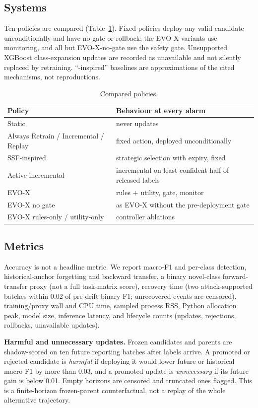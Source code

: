 \documentclass[conference]{IEEEtran}
\newcommand{\evox}{\textsc{EVO-X}}
\begin{document}
\subsection{Systems}
Ten policies are compared (Table~\ref{tab:systems}). Fixed policies deploy any valid candidate unconditionally and have no gate or rollback; the \evox{} variants use monitoring, and all but \evox-no-gate use the safety gate. Unsupported XGBoost class-expansion updates are recorded as unavailable and not silently replaced by retraining. ``-inspired'' baselines are approximations of the cited mechanisms, not reproductions.
\begin{table}[t]
\centering\caption{Compared policies.}\label{tab:systems}
\footnotesize
\begin{tabular}{ll}
\toprule
Policy & Behaviour at every alarm\\
\midrule
Static & never updates\\
Always Retrain / Incremental / Replay & fixed action, deployed unconditionally\\
SSF-inspired & strategic selection with expiry, fixed\\
Active-incremental & incremental on least-confident half of released labels\\
\evox{} & rules $+$ utility, gate, monitor\\
\evox{} no gate & as \evox{} without the pre-deployment gate\\
\evox{} rules-only / utility-only & controller ablations\\
\bottomrule
\end{tabular}
\end{table}

\subsection{Metrics}
Accuracy is not a headline metric. We report macro-F1 and per-class detection, historical-anchor forgetting and backward transfer, a binary novel-class forward-transfer proxy (not a full task-matrix score), recovery time (two attack-supported batches within 0.02 of pre-drift binary F1; unrecovered events are censored), training/proxy wall and CPU time, sampled process RSS, Python allocation peak, model size, inference latency, and lifecycle counts (updates, rejections, rollbacks, unavailable updates).

\textbf{Harmful and unnecessary updates.} Frozen candidates and parents are shadow-scored on ten future reporting batches after labels arrive. A promoted or rejected candidate is \emph{harmful} if deploying it would lower future or historical macro-F1 by more than 0.03, and a promoted update is \emph{unnecessary} if its future gain is below 0.01. Empty horizons are censored and truncated ones flagged. This is a finite-horizon frozen-parent counterfactual, not a replay of the whole alternative trajectory.
\end{document}
